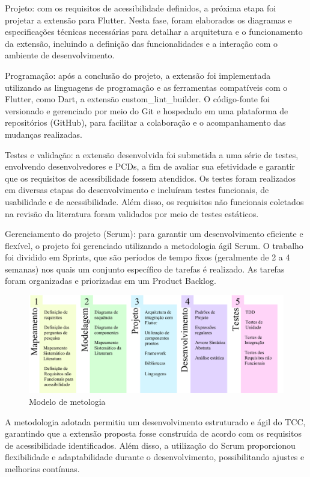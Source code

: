 Projeto: com os requisitos de acessibilidade definidos, a próxima etapa foi projetar a extensão para Flutter. Nesta fase, foram elaborados os diagramas e especificações técnicas necessárias para detalhar a arquitetura e o funcionamento da extensão, incluindo a definição das funcionalidades e a interação com o ambiente de desenvolvimento.

Programação: após a conclusão do projeto, a extensão foi implementada utilizando as linguagens de programação e as ferramentas compatíveis com o Flutter, como Dart, a extensão custom\_lint\_builder. O código-fonte foi versionado e gerenciado por meio do Git e hospedado em uma plataforma de repositórios (GitHub), para facilitar a colaboração e o acompanhamento das mudanças realizadas.

Testes e validação: a extensão desenvolvida foi submetida a uma série de testes, envolvendo desenvolvedores e PCDs, a fim de avaliar sua efetividade e garantir que os requisitos de acessibilidade fossem atendidos. Os testes foram realizados em diversas etapas do desenvolvimento e incluíram testes funcionais, de usabilidade e de acessibilidade. Além disso, os requisitos não funcionais coletados na revisão da literatura foram validados por meio de testes estáticos.

Gerenciamento do projeto (Scrum): para garantir um desenvolvimento eficiente e flexível, o projeto foi gerenciado utilizando a metodologia ágil Scrum. O trabalho foi dividido em Sprints, que são períodos de tempo fixos (geralmente de 2 a 4 semanas) nos quais um conjunto específico de tarefas é realizado. As tarefas foram organizadas e priorizadas em um Product Backlog.

\begin{figure}[!h]
	\centering
	\label{fig:metodologia}
	\caption{Modelo de metologia}
	\includegraphics[scale=1]{Assets/Modelo de metodologia.png}
\end{figure}

A metodologia adotada permitiu um desenvolvimento estruturado e ágil do TCC, garantindo que a extensão proposta fosse construída de acordo com os requisitos de acessibilidade identificados. Além disso, a utilização do Scrum proporcionou flexibilidade e adaptabilidade durante o desenvolvimento, possibilitando ajustes e melhorias contínuas.

